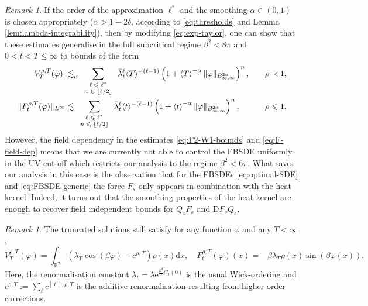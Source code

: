 \documentclass[11pt, a4paper]{scrartcl}
\numberwithin{equation}{section}
\theoremstyle{plain}
\theoremstyle{remark}
\newtheorem{remark}[foo]{Remark}
\newcommand{\assign}{:=}
\newcommand{\mathD}{\mathrm{D}}
\newcommand{\mathd}{\mathrm{d}}
\newcommand{\mathe}{\mathrm{e}}
\newcommand{\tmscript}[1]{\text{\scriptsize{$#1$}}}
\begin{document}
\begin{remark}
  \label{rem:b<gtr>6}If the order of the approximation $\ell^{\ast}$ and the
  smoothing $\alpha \in (0, 1)$ is chosen appropriately ($\alpha > 1 - 2
  \delta$, according to \eqref{eq:thresholds} and Lemma
  \ref{lem:lambda-integrability}), then by modifying \eqref{eq:exp-taylor},
  one can show that these estimates generalise in the full subcritical regime
  $\beta^2 < 8 \pi$  and $0 < t < T \leqslant \infty$ to bounds of the form
  \begin{equation}
    \begin{aligned}
      | V_T^{\rho, T} (\varphi) | &\lesssim_{\rho} 
      \sum_{\tmscript{\begin{array}{c}
        \ell \leqslant \ell^{\ast}\\
        n \leqslant \lfloor{\ell / 2}\rfloor
      \end{array}}} \bar{\lambda}_t^{\ell} \langle T \rangle^{- (\ell - 1)}  \left(
      1 + \left\langle T \right\rangle^{- \alpha} \| \varphi
      \|_{B_{\infty, \infty}^{2 \alpha}} \right)^n, & \quad \rho\prec1,\\
      \| F_t^{\rho, T} (\varphi) \|_{L^{\infty}} &\lesssim 
      \sum_{\tmscript{\begin{array}{c}
        \ell \leqslant \ell^{\ast}\\
        n \leqslant \lfloor{\ell / 2}\rfloor
      \end{array}}} \bar{\lambda}_t^{\ell} \langle t \rangle^{- (\ell - 1)}  \left(
      1 + \left\langle t \right\rangle^{- \alpha} \| \varphi
      \|_{B_{\infty, \infty}^{2 \alpha}} \right)^n, &\quad \rho\leqslant1.
    \end{aligned} \label{eq:F-field-dep}
  \end{equation}
  However, the field dependency in the estimates \eqref{eq:F2-W1-bounds} and
  \eqref{eq:F-field-dep} means that we are currently not able to control the
  FBSDE uniformly in the UV-cut-off which restricts our analysis to the regime
  $\beta^2 < 6 \pi$. What saves our analysis in this case is the observation
  that for the FBSDEs \eqref{eq:optimal-SDE} and \eqref{eq:FBSDE-generic} the
  force $F_s$ only appears in combination with the heat kernel. Indeed, it
  turns out that the smoothing
  properties of the heat kernel are enough to recover field independent bounds for $Q_s
  F_s$ and $\mathD F_s Q_s$.
\end{remark}

\begin{remark}
  The truncated solutions still satisfy for any function $\varphi$ and any $T
  < \infty$,
  \begin{equation}
    V^{\rho, T}_T (\varphi) = \int_{\mathbb{R}^2} (\lambda_T \cos (\beta
    \varphi) - c^{\rho, T}) \rho (x) \mathd x, \quad F^{\rho, T}_t (\varphi)
    (x) = - \beta \lambda_T \rho (x) \sin (\beta \varphi (x)) . \label{eq:FTT}
  \end{equation}
  Here, the renormalisation constant $\lambda_t = \lambda
  \mathe^{\frac{\beta^2}{2} G_t (0)}$ is the usual Wick-ordering and $c^{\rho,
  T} \assign \sum_{\ell} c^{[\ell], \rho, T}$ is the additive renormalisation
  resulting from higher order corrections.
\end{remark}
\end{document}
